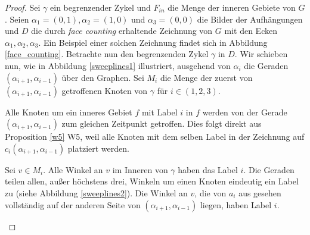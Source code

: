 \begin{proof}
Sei $\gamma$ ein begrenzender Zykel und $F_{in}$ die Menge der inneren Gebiete von $G$. Seien $\alpha_1=(0,1),\alpha_2=(1,0)$ und $\alpha_3=(0,0)$ die Bilder der Aufhängungen und $D$ die durch \textit{face counting} erhaltende Zeichnung von $G$ mit den Ecken $\alpha_1,\alpha_2,\alpha_3$. Ein Beispiel einer solchen Zeichnung findet sich in Abbildung \ref{face_counting}. Betrachte nun den begrenzenden Zykel $\gamma$ in $D$. Wir schieben nun, wie in Abbildung \ref{sweeplines1} illustriert, ausgehend von $\alpha_i$ die Geraden $(\alpha_{i+1},\alpha_{i-1})$ über den Graphen. Sei $M_i$ die Menge der zuerst von $(\alpha_{i+1},\alpha_{i-1})$ getroffenen Knoten von $\gamma$ für $i \in (1,2,3)$.

\begin{observation}\label{obs1}
Alle Knoten um ein inneres Gebiet $f$ mit Label $i$ in $f$ werden von der Gerade $(\alpha_{i+1},\alpha_{i-1})$ zum gleichen Zeitpunkt getroffen. Dies folgt direkt aus Proposition \ref{w5} W5, weil alle Knoten mit dem selben Label in der Zeichnung auf $c_i(\alpha_{i+1},\alpha_{i-1})$ platziert werden.
\end{observation}

\begin{observation}\label{obs2}
Sei $v \in M_i$. Alle Winkel an $v$ im Inneren von $\gamma$ haben das Label $i$. Die Geraden teilen allen, außer höchstens drei, Winkeln um einen Knoten eindeutig ein Label zu (siehe Abbildung \ref{sweeplines2}). Die Winkel an $v$, die von $a_i$ aus gesehen vollständig auf der anderen Seite von $(\alpha_{i+1},\alpha_{i-1})$ liegen, haben Label $i$.
\end{observation}

\captionsetup{format=plain,labelsep=endash,justification=raggedright,width=.47\textwidth}


\end{proof}

